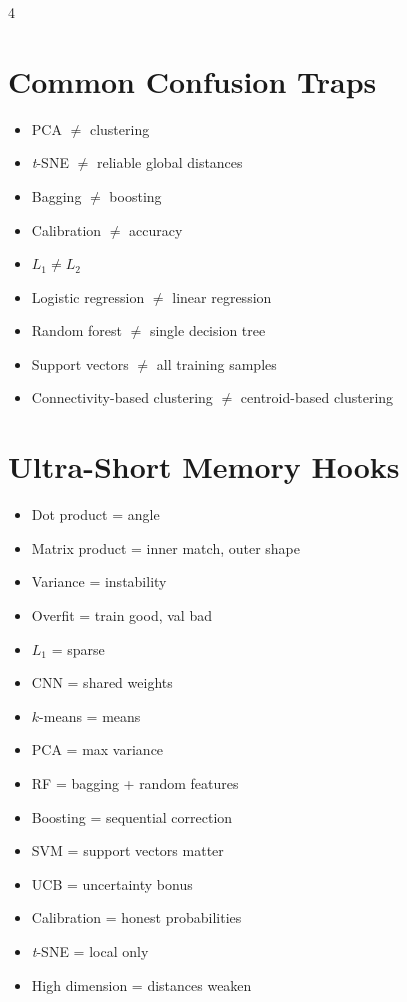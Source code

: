 \documentclass[11pt,landscape]{article}
\begin{document}
\begin{multicols}{4}
		\section{Common Confusion Traps}
		\begin{itemize}
			\item PCA $\neq$ clustering
			\item \textit{t}-SNE $\neq$ reliable global distances
			\item Bagging $\neq$ boosting
			\item Calibration $\neq$ accuracy
			\item $L_1 \neq L_2$
			\item Logistic regression $\neq$ linear regression
			\item Random forest $\neq$ single decision tree
			\item Support vectors $\neq$ all training samples
			\item Connectivity-based clustering $\neq$ centroid-based clustering
		\end{itemize}
		
		\section{Ultra-Short Memory Hooks}
		\begin{itemize}
			\item Dot product = angle
			\item Matrix product = inner match, outer shape
			\item Variance = instability
			\item Overfit = train good, val bad
			\item $L_1$ = sparse
			\item CNN = shared weights
			\item $k$-means = means
			\item PCA = max variance
			\item RF = bagging + random features
			\item Boosting = sequential correction
			\item SVM = support vectors matter
			\item UCB = uncertainty bonus
			\item Calibration = honest probabilities
			\item \textit{t}-SNE = local only
			\item High dimension = distances weaken
		\end{itemize}
		
	\end{multicols}
	
\end{document}
